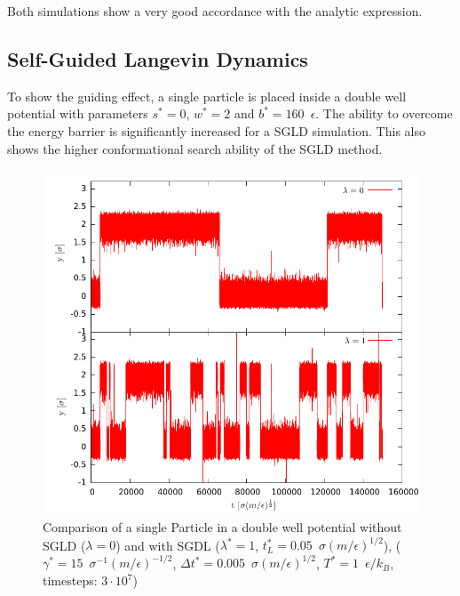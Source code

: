 \documentclass[a4paper]{article}
\begin{document}
Both simulations show a very good accordance with the analytic expression.

\newpage
\subsection{Self-Guided Langevin Dynamics}

To show the guiding effect, a single particle is placed inside a double well potential with parameters $s^* = 0$, $w^* = 2$ and $b^* = 160 \enspace \epsilon$. The ability to overcome the energy barrier is significantly increased for a SGLD simulation. This also shows the higher conformational search ability of the SGLD method.

\begin{figure} [H]
\centering
\includegraphics[width=350pt]{comparison}
\caption{Comparison of a single Particle in a double well potential without SGLD ($\lambda = 0$) and with SGDL ($\lambda^* = 1$, $t_L^* = 0.05 \enspace \sigma (m/\epsilon)^{1/2}$), ($\gamma^* = 15 \enspace \sigma^{-1} (m/\epsilon)^{-1/2}$, $\Delta t^* = 0.005 \enspace \sigma (m/\epsilon)^{1/2}$, $T^* = 1 \enspace \epsilon/k_B$, timesteps: $3 \cdot 10^7$)}
\label{im:verlet_boltzmann}
\end{figure}
\end{document}
